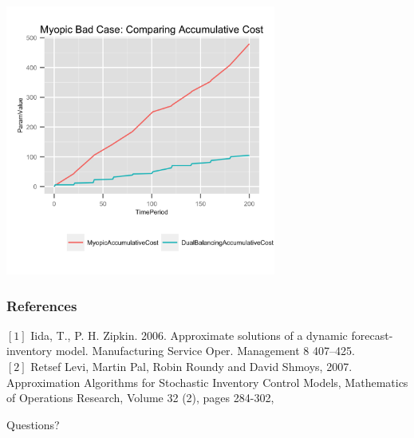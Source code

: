 \documentclass{beamer}
\begin{document}
\begin{frame}
  \includegraphics[height=3.5in]{figures/MyopicBadAccumulativeCost.png}
\end{frame}

\begin{frame}
    \frametitle{References}
    $[1]$ Iida, T., P. H. Zipkin. 2006. Approximate solutions of a dynamic forecast-inventory model. Manufacturing Service Oper. Management
8 407–425.\\

    $[2]$ Retsef Levi, Martin Pal, Robin Roundy and David Shmoys, 2007. Approximation Algorithms for Stochastic Inventory Control Models, Mathematics of Operations Research, Volume 32 (2), pages 284-302, 
\end{frame}
\begin{frame}
\Large
  \begin{center}
  Questions?
  \end{center}
\end{frame}
\end{document}
